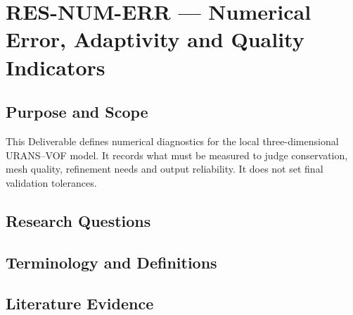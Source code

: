 
\section{RES-NUM-ERR --- Numerical Error, Adaptivity and Quality Indicators}
\label{sec:res-num-err}

\subsection{Purpose and Scope}
\label{sec:res-num-err-purpose}


This Deliverable defines numerical diagnostics for the local
three-dimensional URANS--VOF model. It records what must be measured to
judge conservation, mesh quality, refinement needs and output
reliability. It does not set final validation tolerances.

\subsection{Research Questions}
\label{sec:res-num-err-research-questions}


\subsection{Terminology and Definitions}
\label{sec:res-num-err-definitions}


\subsection{Literature Evidence}
\label{sec:res-num-err-literature-evidence}

